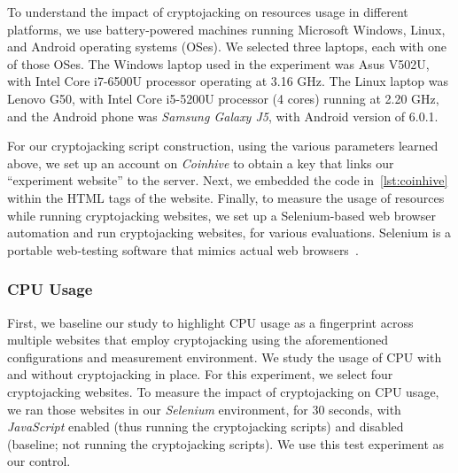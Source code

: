 \documentclass[acmlarge]{acmart}
\newcommand{\slx}{{\em Selenium}\xspace}
\newcommand{\ch}{{\em Coinhive}\xspace}
\newcommand{\js}{{\em JavaScript}\xspace}
\newcommand{\cj}{cryptojacking\xspace}
\begin{document}
To understand the impact of \cj on resources usage in different platforms, we use battery-powered machines running Microsoft Windows, Linux, and Android operating systems (OSes). We selected three laptops, each with one of those OSes. The Windows laptop used in the experiment was Asus V502U, with Intel Core i7-6500U processor operating at 3.16 GHz. The Linux laptop was Lenovo G50, with Intel Core i5-5200U processor (4 cores) running at 2.20 GHz, and the Android phone was {\em Samsung Galaxy J5}, with Android version of 6.0.1.
 






For our \cj script construction, using the various parameters learned above, we set up an account on \ch to obtain a key that links our ``experiment website'' to the server. Next, we embedded the code in~\autoref{lst:coinhive} within the HTML tags of the website. Finally, to measure the usage of resources while running \cj websites, we set up a Selenium-based web browser automation and run \cj websites, for various evaluations. Selenium is a portable web-testing software that mimics actual web browsers~\cite{bruns2009web,seleniumdocumentation}. 





\subsubsection{CPU Usage} 
First, we baseline our study to highlight CPU usage as a fingerprint across multiple websites that employ \cj using the aforementioned configurations and measurement environment. We study the usage of CPU with and without \cj in place. For this experiment, we select four \cj websites. To measure the impact of \cj on CPU usage, we ran those websites in our \slx environment, for 30 seconds, with \js enabled (thus running the \cj scripts) and disabled (baseline; not running the \cj scripts). We use this test experiment as our control. 
\end{document}
